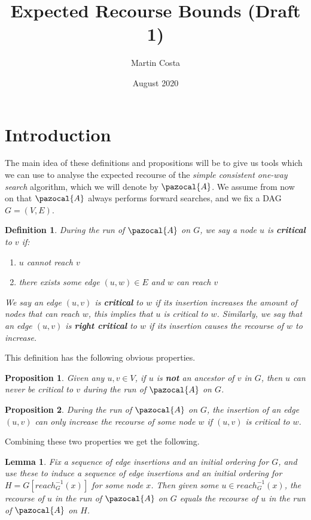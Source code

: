 \documentclass{article}
\title{Expected Recourse Bounds (Draft 1)}
\author{Martin Costa}
\date{August 2020}
\newtheorem{lemma}{Lemma}
\newtheorem{proposition}{Proposition}
\newtheorem{definition}{Definition}
\begin{document}
\maketitle

\section{Introduction}

The main idea of these definitions and propositions will be to give us tools which we can use to analyse the expected recourse of the \textit{simple consistent one-way search} algorithm, which we will denote by $\pazocal{A}$. We assume from now on that $\pazocal{A}$ always performs forward searches, and we fix a DAG $G=(V,E)$.

\begin{definition}
During the run of $\pazocal{A}$ on $G$, we say a node $u$ is \textbf{critical} to $v$ if:
\begin{enumerate}
    \item $u$ cannot reach $v$
    \item there exists some edge $(u,w) \in E$ and $w$ can reach $v$ 
\end{enumerate}
We say an edge $(u,v)$ is \textbf{critical} to $w$ if its insertion increases the amount of nodes that can reach $w$, this implies that $u$ is critical to $w$. Similarly, we say that an edge $(u,v)$ is \textbf{right critical} to $w$ if its insertion causes the recourse of $w$ to increase.
\end{definition}

This definition has the following obvious properties.

\begin{proposition}
Given any $u,v \in V$, if $u$ is \textbf{not} an ancestor of $v$ in $G$, then $u$ can never be critical to $v$ during the run of $\pazocal{A}$ on $G$. 
\end{proposition}

\begin{proposition}
During the run of $\pazocal{A}$ on $G$, the insertion of an edge $(u,v)$ can only increase the recourse of some node $w$ if $(u,v)$ is critical to $w$.
\end{proposition}

Combining these two properties we get the following.

\begin{lemma}
Fix a sequence of edge insertions and an initial ordering for $G$, and use these to induce a sequence of edge insertions and an initial ordering for $H = G[reach^{-1}_{G}(x)]$ for some node $x$. Then given some $u \in reach^{-1}_{G}(x)$, the recourse of $u$ in the run of $\pazocal{A}$ on $G$ equals the recourse of $u$ in the run of $\pazocal{A}$ on $H$.
\end{lemma}
\end{document}
